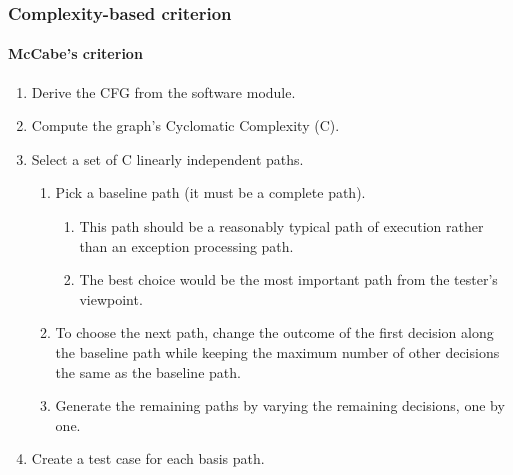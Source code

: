 \begin{frame}
\label{procedure:mccabe-criterion}
\frametitle{Complexity-based criterion}
\framesubtitle{McCabe's criterion}

\begin{block:procedure}{}
\begin{enumerate}
	\item Derive the CFG from the software module.
	\item Compute the graph's Cyclomatic Complexity (C).
	\item Select a set of C linearly independent paths.
	\begin{enumerate}
		\item Pick a baseline path (it must be a complete path).
		\begin{enumerate}
			\item This path should be a reasonably typical path of execution
			rather than an exception processing path.

			\item The best choice would be the most important path from the
			tester's viewpoint.
		\end{enumerate}

		\item To choose the next path, change the outcome of the first decision
		along the baseline path while keeping the maximum number of other
		decisions the same as the baseline path.

		\item Generate the remaining paths by varying the remaining decisions,
		one by one.
	\end{enumerate}
	\item Create a test case for each basis path.
\end{enumerate}
\end{block:procedure}


\hfill
\hyperlink{example:mccabe}{}
\end{frame}
